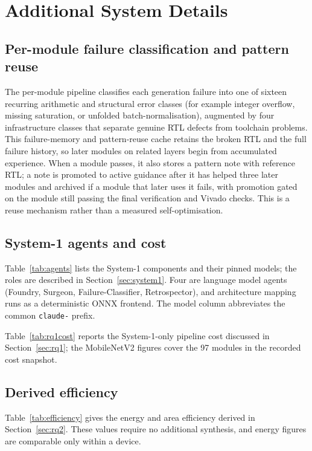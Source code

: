 \documentclass[acmtog,authorversion]{acmart}
\begin{document}
\section{Additional System Details}\label{app:details}

\subsection{Per-module failure classification and pattern reuse}\label{app:selfimprove}

The per-module pipeline classifies each generation failure into one of sixteen recurring arithmetic and structural error classes (for example integer overflow, missing saturation, or unfolded batch-normalisation), augmented by four infrastructure classes that separate genuine RTL defects from toolchain problems. This failure-memory and pattern-reuse cache retains the broken RTL and the full failure history, so later modules on related layers begin from accumulated experience. When a module passes, it also stores a pattern note with reference RTL; a note is promoted to active guidance after it has helped three later modules and archived if a module that later uses it fails, with promotion gated on the module still passing the final verification and Vivado checks. This is a reuse mechanism rather than a measured self-optimisation.

\subsection{System-1 agents and cost}\label{app:agents}

Table~\ref{tab:agents} lists the System-1 components and their pinned models; the roles are described in Section~\ref{sec:system1}. Four are language model agents (Foundry, Surgeon, Failure-Classifier, Retrospector), and architecture mapping runs as a deterministic ONNX frontend. The model column abbreviates the common \texttt{claude-} prefix.

Table~\ref{tab:rq1cost} reports the System-1-only pipeline cost discussed in Section~\ref{sec:rq1}; the MobileNetV2 figures cover the 97 modules in the recorded cost snapshot.

\subsection{Derived efficiency}\label{app:efficiency}

Table~\ref{tab:efficiency} gives the energy and area efficiency derived in Section~\ref{sec:rq2}. These values require no additional synthesis, and energy figures are comparable only within a device.
\end{document}
